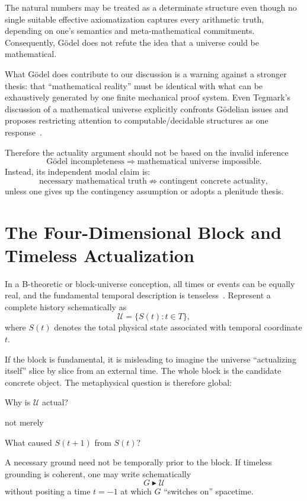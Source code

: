 \documentclass[11pt,letterpaper]{article}
\theoremstyle{plain}
\theoremstyle{definition}
\newcommand{\grounds}{\blacktriangleright}
\begin{document}
The natural numbers may be treated as a determinate structure even though no single suitable effective axiomatization captures every arithmetic truth, depending on one's semantics and meta-mathematical commitments. Consequently, Gödel does not refute the idea that a universe could be mathematical.

What Gödel does contribute to our discussion is a warning against a stronger thesis: that ``mathematical reality'' must be identical with what can be exhaustively generated by one finite mechanical proof system. Even Tegmark's discussion of a mathematical universe explicitly confronts Gödelian issues and proposes restricting attention to computable/decidable structures as one response~\cite{tegmark}.

Therefore the actuality argument should not be based on the invalid inference
\[
  \text{Gödel incompleteness} \Rightarrow \text{mathematical universe impossible}.
\]
Instead, its independent modal claim is:
\[
  \text{necessary mathematical truth} \not\Rightarrow \text{contingent concrete actuality},
\]
unless one gives up the contingency assumption or adopts a plenitude thesis.

\section{The Four-Dimensional Block and Timeless Actualization}

In a B-theoretic or block-universe conception, all times or events can be equally real, and the fundamental temporal description is tenseless~\cite{deng}. Represent a complete history schematically as
\[
  \mathcal{U} = \{S(t) : t \in T\},
\]
where $S(t)$ denotes the total physical state associated with temporal coordinate $t$.

If the block is fundamental, it is misleading to imagine the universe ``actualizing itself'' slice by slice from an external time. The whole block is the candidate concrete object. The metaphysical question is therefore global:
\begin{center}
Why is $\mathcal{U}$ actual?
\end{center}
not merely
\begin{center}
What caused $S(t+1)$ from $S(t)$?
\end{center}

A necessary ground need not be temporally prior to the block. If timeless grounding is coherent, one may write schematically
\[
  G \grounds \mathcal{U}
\]
without positing a time $t = -1$ at which $G$ ``switches on'' spacetime.
\end{document}
